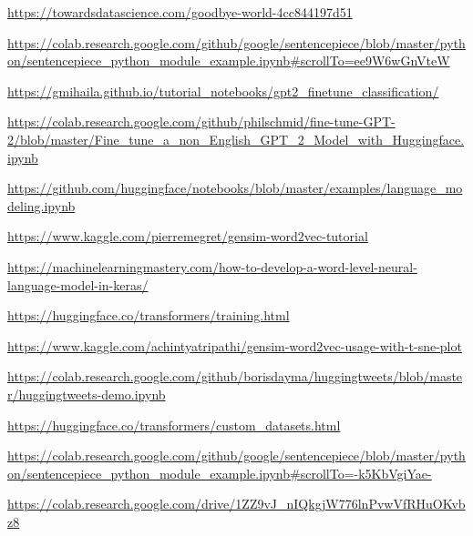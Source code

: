 \documentclass[12pt, a4paper]{article}
\begin{document}
\newpage



\begin{thebibliography}{9}
	\url{https://towardsdatascience.com/goodbye-world-4cc844197d51}
	
	\url{https://colab.research.google.com/github/google/sentencepiece/blob/master/python/sentencepiece_python_module_example.ipynb#scrollTo=ee9W6wGnVteW}
	
	\url{https://gmihaila.github.io/tutorial_notebooks/gpt2_finetune_classification/}
	
	\url{https://colab.research.google.com/github/philschmid/fine-tune-GPT-2/blob/master/Fine_tune_a_non_English_GPT_2_Model_with_Huggingface.ipynb}
	
	\url{https://github.com/huggingface/notebooks/blob/master/examples/language_modeling.ipynb}
	
	\url{https://www.kaggle.com/pierremegret/gensim-word2vec-tutorial}
	
	\url{https://machinelearningmastery.com/how-to-develop-a-word-level-neural-language-model-in-keras/}
	
	\url{https://huggingface.co/transformers/training.html}
	
	\url{https://www.kaggle.com/achintyatripathi/gensim-word2vec-usage-with-t-sne-plot}
	
	\url{https://colab.research.google.com/github/borisdayma/huggingtweets/blob/master/huggingtweets-demo.ipynb}
	
	\url{https://huggingface.co/transformers/custom_datasets.html}
	
	\url{https://colab.research.google.com/github/google/sentencepiece/blob/master/python/sentencepiece_python_module_example.ipynb#scrollTo=-k5KbVgiYae-}
	
	\url{https://colab.research.google.com/drive/1ZZ9vJ_nIQkgjW776lnPvwVfRHuOKvbz8}
	
\end{thebibliography}
\end{document}
